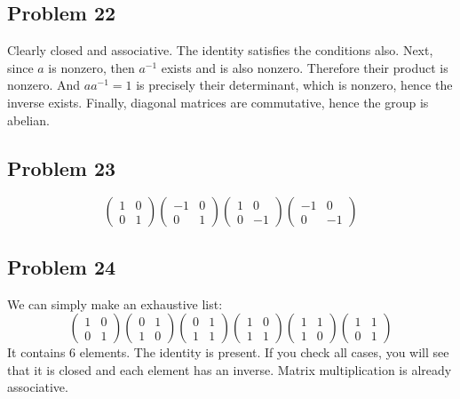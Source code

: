 \documentclass{book}
\begin{document}
\subsection*{Problem 22}
Clearly closed and associative. The identity satisfies the conditions also. Next, since $a$ is nonzero, then $a^{-1}$ exists and is also nonzero. Therefore their product is nonzero. And $a a^{-1} = 1$ is precisely their determinant, which is nonzero, hence the inverse exists. Finally, diagonal matrices are commutative, hence the group is abelian.

\subsection*{Problem 23}
$$\begin{pmatrix}
    1 & 0 \\
    0 & 1
\end{pmatrix}
\begin{pmatrix}
    -1 & 0 \\
    0 & 1
\end{pmatrix}
\begin{pmatrix}
    1 & 0 \\
    0 & -1
\end{pmatrix}
\begin{pmatrix}
    -1 & 0 \\
    0 & -1
\end{pmatrix}$$

\subsection*{Problem 24}
We can simply make an exhaustive list:
$$\begin{pmatrix}
    1 & 0 \\
    0 & 1
\end{pmatrix}
\begin{pmatrix}
    0 & 1 \\
    1 & 0
\end{pmatrix}
\begin{pmatrix}
    0 & 1 \\
    1 & 1
\end{pmatrix}
\begin{pmatrix}
    1 & 0 \\
    1 & 1
\end{pmatrix}
\begin{pmatrix}
    1 & 1 \\
    1 & 0
\end{pmatrix}
\begin{pmatrix}
    1 & 1 \\
    0 & 1
\end{pmatrix}$$
It contains 6 elements. The identity is present. If you check all cases, you will see that it is closed and each element has an inverse. Matrix multiplication is already associative.
\end{document}
